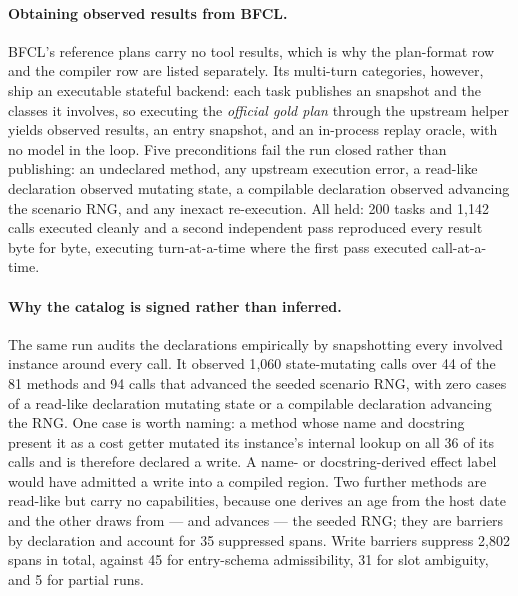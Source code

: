 \paragraph{Obtaining observed results from BFCL.}
BFCL's reference plans carry no tool results, which is why the plan-format row
and the compiler row are listed separately. Its multi-turn categories, however,
ship an executable stateful backend: each task publishes an 
snapshot and the classes it involves, so executing the \emph{official gold plan}
through the upstream helper yields observed results, an entry snapshot, and an
in-process replay oracle, with no model in the loop. Five preconditions fail the
run closed rather than publishing: an undeclared method, any upstream execution
error, a read-like declaration observed mutating state, a compilable declaration
observed advancing the scenario RNG, and any inexact re-execution. All held: 200
tasks and 1{,}142 calls executed cleanly and a second independent pass reproduced
every result byte for byte, executing turn-at-a-time where the first pass executed
call-at-a-time.

\paragraph{Why the catalog is signed rather than inferred.}
The same run audits the declarations empirically by snapshotting every involved
instance around every call. It observed 1{,}060 state-mutating calls over 44 of
the 81 methods and 94 calls that advanced the seeded scenario RNG, with zero cases
of a read-like declaration mutating state or a compilable declaration advancing the
RNG. One case is worth naming: a method whose name and docstring present it as a
cost getter mutated its instance's internal lookup on all 36 of its calls and is
therefore declared a write. A name- or docstring-derived effect label would have
admitted a write into a compiled region. Two further methods are read-like but
carry no capabilities, because one derives an age from the host date and the other
draws from --- and advances --- the seeded RNG; they are barriers by declaration and
account for 35 suppressed spans. Write barriers suppress 2{,}802 spans in total,
against 45 for entry-schema admissibility, 31 for slot ambiguity, and 5 for
partial runs.

